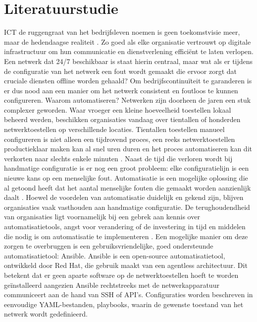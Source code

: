 
\section{Literatuurstudie}%
\label{sec:literatuurstudie}

ICT de ruggengraat van het bedrijfsleven noemen is geen toekomstvisie meer, maar de hedendaagse realiteit \autocite{OlalereAbiodun2023}. 
Zo goed als elke organisatie vertrouwt op digitale infrastructuur om hun communicatie en dienstverlening efficiënt te laten verlopen.
Een netwerk dat 24/7 beschikbaar is staat hierin centraal, maar wat als er tijdens de configuratie van het netwerk een fout wordt gemaakt die ervoor zorgt dat cruciale diensten offline worden gehaald?
Om bedrijfscontinuïteit te garanderen is er dus nood aan een manier om het netwerk consistent en foutloos te kunnen configureren.
Waarom automatiseren? Netwerken zijn doorheen de jaren een stuk complexer geworden. Waar vroeger een kleine hoeveelheid toestellen lokaal beheerd werden, beschikken organisaties vandaag over tientallen of honderden netwerktoestellen op verschillende locaties. 
Tientallen toestellen manueel configureren is niet alleen een tijdrovend proces, een reeks netwerktoestellen productieklaar maken kan al snel uren duren en het proces automatiseren kan dit verkorten naar slechts enkele minuten \autocite{Younes2024}.
Naast de tijd die verloren wordt bij handmatige configuratie is er nog een groot probleem: elke configuratielijn is een nieuwe kans op een menselijke fout. 
Automatisatie is een mogelijke oplossing die al getoond heeft dat het aantal menselijke fouten die gemaakt worden aanzienlijk daalt \autocite{Diekmann_2015}.
Hoewel de voordelen van automatisatie duidelijk en gekend zijn, blijven organisaties vaak vasthouden aan handmatige configuratie. 
De terughoudendheid van organisaties ligt voornamelijk bij een gebrek aan kennis over automatisatietools, angst voor verandering of de investering in tijd en middelen die nodig is om automatisatie te implementeren \autocite{EMAItential2021}.
Een mogelijke manier om deze zorgen te overbruggen is een gebruiksvriendelijke, goed ondersteunde automatisatietool: Ansible.
Ansible is een open-source automatisatietool, ontwikkeld door Red Hat, die gebruik maakt van een agentless architectuur.
Dit betekent dat er geen aparte software op de netwerktoestellen hoeft te worden geïnstalleerd aangezien Ansible rechtstreeks met de netwerkapparatuur communiceert aan de hand van SSH of API's. Configuraties worden beschreven in eenvoudige YAML-bestanden, playbooks, waarin de gewenste toestand van het netwerk wordt gedefinieerd.
